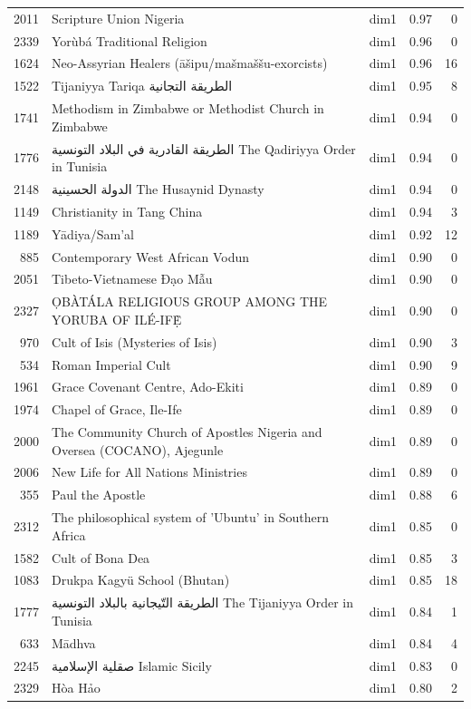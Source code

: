 \begin{tabular}{rllrr}
2011 & Scripture Union Nigeria & dim1 & 0.97 & 0 \\
2339 & Yorùbá Traditional Religion & dim1 & 0.96 & 0 \\
1624 & Neo-Assyrian Healers (āšipu/mašmaššu-exorcists) & dim1 & 0.96 & 16 \\
1522 & Tijaniyya Tariqa الطريقة التجانية & dim1 & 0.95 & 8 \\
1741 & Methodism in Zimbabwe or Methodist Church in Zimbabwe & dim1 & 0.94 & 0 \\
1776 & الطريقة القادرية في البلاد التونسية The Qadiriyya Order in Tunisia & dim1 & 0.94 & 0 \\
2148 & الدولة الحسينية The Husaynid Dynasty & dim1 & 0.94 & 0 \\
1149 & Christianity in Tang China & dim1 & 0.94 & 3 \\
1189 & Yādiya/Sam'al & dim1 & 0.92 & 12 \\
885 & Contemporary West African Vodun & dim1 & 0.90 & 0 \\
2051 & Tibeto-Vietnamese Đạo Mẫu & dim1 & 0.90 & 0 \\
2327 & ỌBÀTÁLA RELIGIOUS GROUP AMONG THE YORUBA OF ILÉ-IFẸ̀ & dim1 & 0.90 & 0 \\
970 & Cult of Isis (Mysteries of Isis) & dim1 & 0.90 & 3 \\
534 & Roman Imperial Cult & dim1 & 0.90 & 9 \\
1961 & Grace Covenant Centre, Ado-Ekiti & dim1 & 0.89 & 0 \\
1974 & Chapel of Grace, Ile-Ife & dim1 & 0.89 & 0 \\
2000 & The Community Church of Apostles Nigeria and Oversea (COCANO), Ajegunle & dim1 & 0.89 & 0 \\
2006 & New Life for All Nations Ministries & dim1 & 0.89 & 0 \\
355 & Paul the Apostle & dim1 & 0.88 & 6 \\
2312 & The philosophical system of 'Ubuntu' in Southern Africa & dim1 & 0.85 & 0 \\
1582 & Cult of Bona Dea & dim1 & 0.85 & 3 \\
1083 & Drukpa Kagyü School (Bhutan) & dim1 & 0.85 & 18 \\
1777 & الطريقة التّيجانية بالبلاد التونسية The Tijaniyya Order in Tunisia & dim1 & 0.84 & 1 \\
633 & Mādhva & dim1 & 0.84 & 4 \\
2245 & صقلية الإسلامية Islamic Sicily & dim1 & 0.83 & 0 \\
2329 & Hòa Hảo & dim1 & 0.80 & 2 \\

\end{tabular}
